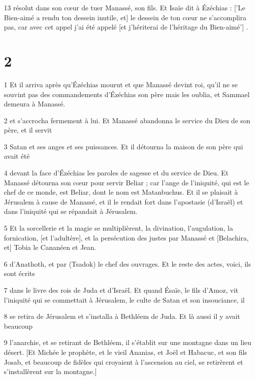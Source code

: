 \par 13 résolut dans son cœur de tuer Manassé, son fils. Et Isaïe dit à Ézéchias : ['Le Bien-aimé a rendu ton dessein inutile, et] le dessein de ton cœur ne s'accomplira pas, car avec cet appel j'ai été appelé [et j'hériterai de l'héritage du Bien-aimé'] .

\chapter{2}

\par 1 Et il arriva après qu'Ézéchias mourut et que Manassé devint roi, qu'il ne se souvint pas des commandements d'Ézéchias son père mais les oublia, et Sammael demeura à Manassé.

\par 2 et s'accrocha fermement à lui. Et Manassé abandonna le service du Dieu de son père, et il servit

\par 3 Satan et ses anges et ses puissances. Et il détourna la maison de son père qui avait été

\par 4 devant la face d'Ézéchias les paroles de sagesse et du service de Dieu. Et Manassé détourna son cœur pour servir Beliar ; car l'ange de l'iniquité, qui est le chef de ce monde, est Beliar, dont le nom est Matanbuchus. Et il se plaisait à Jérusalem à cause de Manassé, et il le rendait fort dans l'apostasie (d'Israël) et dans l'iniquité qui se répandait à Jérusalem.

\par 5 Et la sorcellerie et la magie se multiplièrent, la divination, l'augulation, la fornication, [et l'adultère], et la persécution des justes par Manassé et [Belachira, et] Tobia le Cananéen et Jean.

\par 6 d'Anathoth, et par (Tsadok) le chef des ouvrages. Et le reste des actes, voici, ils sont écrits

\par 7 dans le livre des rois de Juda et d'Israël. Et quand Ésaïe, le fils d'Amoz, vit l'iniquité qui se commettait à Jérusalem, le culte de Satan et son insouciance, il

\par 8 se retira de Jérusalem et s'installa à Bethléem de Juda. Et là aussi il y avait beaucoup

\par 9 l'anarchie, et se retirant de Bethléem, il s'établit sur une montagne dans un lieu désert. [Et Michée le prophète, et le vieil Ananias, et Joël et Habacuc, et son fils Josab, et beaucoup de fidèles qui croyaient à l'ascension au ciel, se retirèrent et s'installèrent sur la montagne.]


